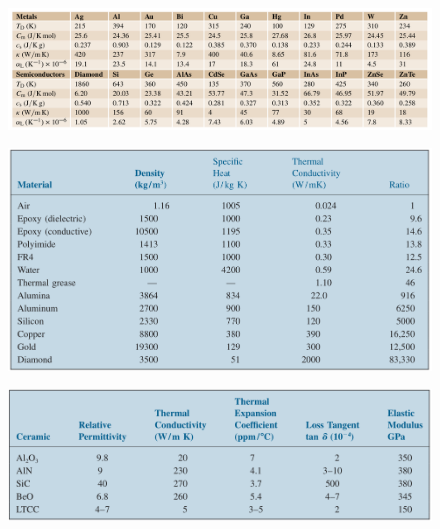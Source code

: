 \documentclass[final]{cubedoc}
\begin{document}
\begin{figure}[h!]
    \centering
    \includegraphics[width=\linewidth]{docs/table_properties_springer.png}
    \caption{\cite[p.428]{kasap2017springer}}
    \label{fig:my_label}
\end{figure}

\begin{figure}[h!]
    \centering
    \includegraphics[width=\linewidth]{docs/table_properties_bible.png}
    \caption{\cite[p.222]{tummala2001fundamentals}}
    \label{fig:fr4properties}
\end{figure}

\begin{figure}[h!]
    \centering
    \includegraphics[width=\linewidth]{docs/table_ceramics_bible.png}
    \caption{\cite[p.718]{tummala2001fundamentals}}
    \label{fig:my_label}
\end{figure}
\end{document}
